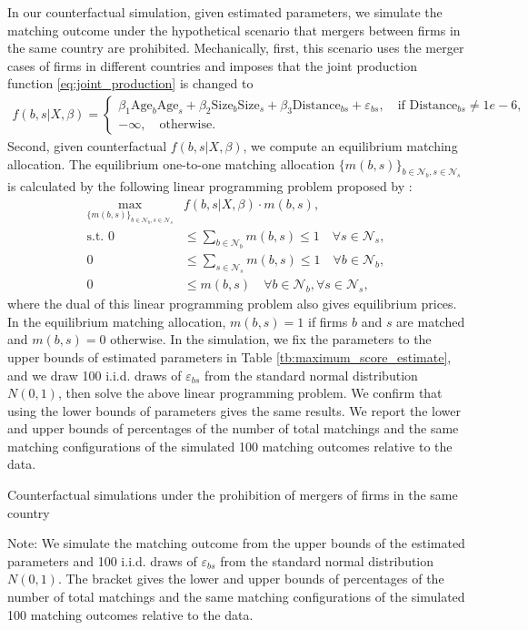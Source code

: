 \documentclass[10pt]{article}
\begin{document}
In our counterfactual simulation, given estimated parameters, we simulate the matching outcome under the hypothetical scenario that mergers between firms in the same country are prohibited. 
Mechanically, first, this scenario uses the merger cases of firms in different countries and imposes that 
the joint production function \eqref{eq:joint_production} is changed to
\begin{align*}
    f(b,s|X,\beta)= \begin{cases}
        \beta_1 \text{Age}_{b}\text{Age}_{s} + \beta_2 \text{Size}_{b}\text{Size}_{s} + \beta_3 \text{Distance}_{bs} + \varepsilon_{bs}, \quad \text{if }\text{Distance}_{bs}\neq 1e-6,\\
        -\infty, \quad \text{otherwise}.
    \end{cases}
\end{align*}
Second, given counterfactual $f(b,s|X,\beta)$, we compute an equilibrium matching allocation. 
The equilibrium one-to-one matching allocation $\{m(b,s)\}_{b\in\mathcal{N}_b,s\in\mathcal{N}_s}$ is calculated by the following linear programming problem proposed by \cite{shapley1971assignment}:
\begin{align*}
    \max_{\{m(b,s)\}_{b\in\mathcal{N}_b,s\in\mathcal{N}_s}} &f(b,s|X,\beta)\cdot m(b,s),\\
    \text{s.t. } 0&\le \sum_{b\in\mathcal{N}_b}m(b,s)\le 1\quad  \forall s \in \mathcal{N}_s,\\
    0&\le \sum_{s\in\mathcal{N}_s}m(b,s)\le 1\quad \forall b \in \mathcal{N}_b,\\
    0&\le m(b,s) \quad \forall b \in \mathcal{N}_b,\forall s \in \mathcal{N}_s,
\end{align*}
where the dual of this linear programming problem also gives equilibrium prices. 
In the equilibrium matching allocation, $m(b,s) = 1$ if firms $b$ and $s$ are matched and $m(b,s) = 0$ otherwise.
In the simulation, we fix the parameters to the upper bounds of estimated parameters in Table \ref{tb:maximum_score_estimate}, and we draw 100 i.i.d. draws of $\varepsilon_{bs}$ from the standard normal distribution $N(0,1)$, then solve the above linear programming problem.
We confirm that using the lower bounds of parameters gives the same results.
We report the lower and upper bounds of percentages of the number of total matchings and the same matching configurations of the simulated 100 matching outcomes relative to the data.

\begin{table}[!htbp]
  \begin{center}
      \caption{Counterfactual simulations under the prohibition of mergers of firms in the same country}
      \label{tb:number_of_mergers_counterfactual} 
      
  \end{center}\footnotesize
  Note: We simulate the matching outcome from the upper bounds of the estimated parameters and 100 i.i.d. draws of $\varepsilon_{bs}$ from the standard normal distribution $N(0,1)$. The bracket gives the lower and upper bounds of percentages of the number of total matchings and the same matching configurations of the simulated 100 matching outcomes relative to the data.
\end{table} 
\end{document}

